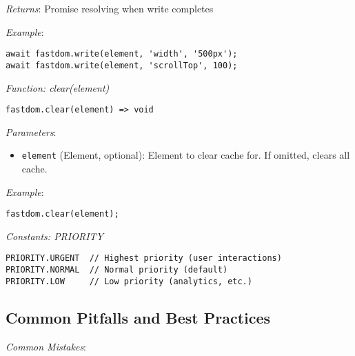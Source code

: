 \documentclass[11pt]{article}
\begin{document}
\emph{Returns}: Promise resolving when write completes

\emph{Example}:
\begin{verbatim}
await fastdom.write(element, 'width', '500px');
await fastdom.write(element, 'scrollTop', 100);
\end{verbatim}

\emph{Function: clear(element)}

\begin{verbatim}
fastdom.clear(element) => void
\end{verbatim}

\emph{Parameters}:

\begin{itemize}
\item \texttt{element} (Element, optional): Element to clear cache for. If omitted, clears all cache.
\end{itemize}

\emph{Example}:
\begin{verbatim}
fastdom.clear(element);
\end{verbatim}

\emph{Constants: PRIORITY}

\begin{verbatim}
PRIORITY.URGENT  // Highest priority (user interactions)
PRIORITY.NORMAL  // Normal priority (default)
PRIORITY.LOW     // Low priority (analytics, etc.)
\end{verbatim}
\subsection{Common Pitfalls and Best Practices}
\label{sec:org1950eb3}

\emph{Common Mistakes}:
\end{document}
